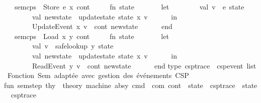 \begin{isabellebody}
\isanewline
\ \ {\isacharbar}{\kern0pt}\ sem{\isacharunderscore}{\kern0pt}cps\ {\isacharunderscore}{\kern0pt}\ {\isacharparenleft}{\kern0pt}Store\ {\isacharparenleft}{\kern0pt}e{\isacharcomma}{\kern0pt}\ x{\isacharparenright}{\kern0pt}{\isacharparenright}{\kern0pt}\ cont\ {\isacharequal}{\kern0pt}\isanewline
\ \ \ \ {\isacharparenleft}{\kern0pt}fn\ state\ {\isacharequal}{\kern0pt}{\isachargreater}{\kern0pt}\isanewline
\ \ \ \ \ \ let\isanewline
\ \ \ \ \ \ \ \ val\ v\ {\isacharequal}{\kern0pt}\ e\ state\isanewline
\ \ \ \ \ \ \ \ val\ new{\isacharunderscore}{\kern0pt}state\ {\isacharequal}{\kern0pt}\ update{\isacharunderscore}{\kern0pt}state\ state\ x\ v\isanewline
\ \ \ \ \ \ in\isanewline
\ \ \ \ \ \ \ \ UpdateEvent\ {\isacharparenleft}{\kern0pt}x{\isacharcomma}{\kern0pt}\ v{\isacharparenright}{\kern0pt}\ {\isacharcolon}{\kern0pt}{\isacharcolon}{\kern0pt}\ cont\ new{\isacharunderscore}{\kern0pt}state\isanewline
\ \ \ \ \ \ end{\isacharparenright}{\kern0pt}\isanewline
\ \ {\isacharbar}{\kern0pt}\ sem{\isacharunderscore}{\kern0pt}cps\ {\isacharunderscore}{\kern0pt}\ {\isacharparenleft}{\kern0pt}Load\ {\isacharparenleft}{\kern0pt}x{\isacharcomma}{\kern0pt}\ y{\isacharparenright}{\kern0pt}{\isacharparenright}{\kern0pt}\ cont\ {\isacharequal}{\kern0pt}\isanewline
\ \ \ \ {\isacharparenleft}{\kern0pt}fn\ state\ {\isacharequal}{\kern0pt}{\isachargreater}{\kern0pt}\isanewline
\ \ \ \ \ \ let\ \ \ \ \ \ \ \ \ \isanewline
\ \ \ \ \ \ \ \ val\ v\ {\isacharequal}{\kern0pt}\ safe{\isacharunderscore}{\kern0pt}lookup\ y\ state\isanewline
\ \ \ \ \ \ \ \ val\ new{\isacharunderscore}{\kern0pt}state\ {\isacharequal}{\kern0pt}\ update{\isacharunderscore}{\kern0pt}state\ state\ x\ v\isanewline
\ \ \ \ \ \ in\isanewline
\ \ \ \ \ \ \ \ ReadEvent\ {\isacharparenleft}{\kern0pt}y{\isacharcomma}{\kern0pt}\ v{\isacharparenright}{\kern0pt}\ {\isacharcolon}{\kern0pt}{\isacharcolon}{\kern0pt}\ cont\ new{\isacharunderscore}{\kern0pt}state\isanewline
\ \ \ \ \ \ end{\isacharparenright}{\kern0pt}\isanewline
type\ csp{\isacharunderscore}{\kern0pt}trace\ {\isacharequal}{\kern0pt}\ csp{\isacharunderscore}{\kern0pt}event\ list\isanewline
\isanewline
{\isacharparenleft}{\kern0pt}{\isacharasterisk}{\kern0pt}\ Fonction\ Sem\ adaptée\ avec\ gestion\ des\ événements\ CSP\ {\isacharasterisk}{\kern0pt}{\isacharparenright}{\kern0pt}\isanewline
fun\ sem{\isacharunderscore}{\kern0pt}step\ {\isacharparenleft}{\kern0pt}thy\ {\isacharcolon}{\kern0pt}\ theory{\isacharparenright}{\kern0pt}\ {\isacharparenleft}{\kern0pt}machine{\isacharcolon}{\kern0pt}\ absy{\isacharparenright}{\kern0pt}\ {\isacharparenleft}{\kern0pt}cmd\ {\isacharcolon}{\kern0pt}\ com{\isacharparenright}{\kern0pt}\ {\isacharparenleft}{\kern0pt}cont\ {\isacharcolon}{\kern0pt}\ state\ {\isacharasterisk}{\kern0pt}\ csp{\isacharunderscore}{\kern0pt}trace\ {\isacharminus}{\kern0pt}{\isachargreater}{\kern0pt}\ state\ {\isacharasterisk}{\kern0pt}\ csp{\isacharunderscore}{\kern0pt}trace{\isacharparenright}{\kern0pt}\ \isanewline

\end{isabellebody}
